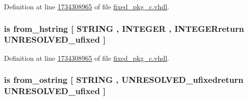 Definition at line \hyperlink{fixed__pkg__c_8vhdl_source_l1734308965}{1734308965} of file \hyperlink{fixed__pkg__c_8vhdl_source}{fixed\+\_\+pkg\+\_\+c.\+vhdl}.

\hypertarget{classfixed__pkg_a03b95d27d5faeed595b531a2333e9947}{}
\subsubsection[{from\+\_\+hex\+\_\+string}]{ {\bfseries \textcolor{keywordflow}{is}\textcolor{vhdlchar}{ }\textcolor{vhdlchar}{from\+\_\+hstring}\textcolor{vhdlchar}{ }\textcolor{vhdlchar}{\mbox{[}}\textcolor{vhdlchar}{ }\textcolor{comment}{S\+T\+R\+I\+N\+G}\textcolor{vhdlchar}{ }\textcolor{vhdlchar}{,}\textcolor{vhdlchar}{ }\textcolor{comment}{I\+N\+T\+E\+G\+E\+R}\textcolor{vhdlchar}{ }\textcolor{vhdlchar}{,}\textcolor{vhdlchar}{ }\textcolor{vhdlchar}{I\+N\+T\+E\+G\+E\+Rreturn}\textcolor{vhdlchar}{ }{\bfseries {\bf U\+N\+R\+E\+S\+O\+L\+V\+E\+D\+\_\+ufixed}} \textcolor{vhdlchar}{ }\textcolor{vhdlchar}{\mbox{]}}\textcolor{vhdlchar}{ }} \hspace{0.3cm}{\ttfamily [Alias]}}\label{classfixed__pkg_a03b95d27d5faeed595b531a2333e9947}


Definition at line \hyperlink{fixed__pkg__c_8vhdl_source_l1734308965}{1734308965} of file \hyperlink{fixed__pkg__c_8vhdl_source}{fixed\+\_\+pkg\+\_\+c.\+vhdl}.

\hypertarget{classfixed__pkg_ae8e9e937706e3de2328aaadf3a10856b}{}
\subsubsection[{from\+\_\+octal\+\_\+string}]{ {\bfseries \textcolor{keywordflow}{is}\textcolor{vhdlchar}{ }\textcolor{vhdlchar}{from\+\_\+ostring}\textcolor{vhdlchar}{ }\textcolor{vhdlchar}{\mbox{[}}\textcolor{vhdlchar}{ }\textcolor{comment}{S\+T\+R\+I\+N\+G}\textcolor{vhdlchar}{ }\textcolor{vhdlchar}{,}\textcolor{vhdlchar}{ }\textcolor{vhdlchar}{U\+N\+R\+E\+S\+O\+L\+V\+E\+D\+\_\+ufixedreturn}\textcolor{vhdlchar}{ }{\bfseries {\bf U\+N\+R\+E\+S\+O\+L\+V\+E\+D\+\_\+ufixed}} \textcolor{vhdlchar}{ }\textcolor{vhdlchar}{\mbox{]}}\textcolor{vhdlchar}{ }} \hspace{0.3cm}{\ttfamily [Alias]}}\label{classfixed__pkg_ae8e9e937706e3de2328aaadf3a10856b}


